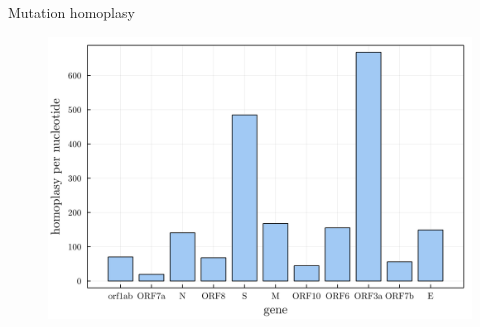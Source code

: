 \documentclass{beamer}
\begin{document}


\begin{frame}[allowframebreaks]



\end{frame}
\begin{frame}{Mutation homoplasy}
    \begin{figure}
        \includegraphics[width=\textwidth]{my_figs/gene_freq.png}
    \end{figure}
\end{frame}
\end{document}
